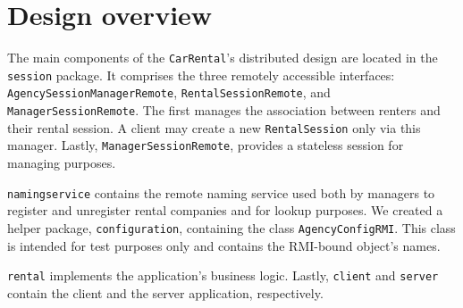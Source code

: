 \section{Design overview}
The main components of the \texttt{CarRental}'s distributed design are located in the \texttt{session} package. It comprises the three remotely accessible interfaces: \texttt{AgencySessionManagerRemote}, \texttt{RentalSessionRemote}, and \texttt{ManagerSessionRemote}. The first manages the association between renters and their rental session. A client may create a new \texttt{RentalSession} only via this manager. Lastly, \texttt{ManagerSessionRemote}, provides a stateless session for managing purposes. 

\texttt{namingservice} contains the remote naming service used both by managers to register and unregister rental companies and for lookup purposes. We created a helper package, \texttt{configuration}, containing the class \texttt{AgencyConfigRMI}. This class is intended for test purposes only and contains the RMI-bound object's names.

\texttt{rental} implements the application's business logic. Lastly, \texttt{client} and \texttt{server} contain the client and the server application, respectively.
